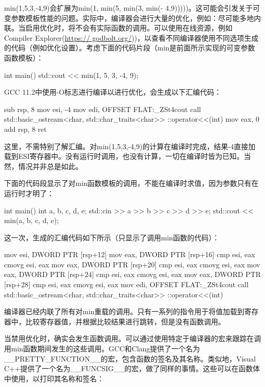 min(1,5,3,-4,9)会扩展为min(1, min(5, min(3, min(- 4,9)))))。这可能会引发关于可变参数模板性能的问题。实际中，编译器会进行大量的优化，例如：尽可能多地内联。当启用优化时，将不会有实际函数的调用。可以使用在线资源，例如Compiler Explorer(\url{https:// godbolt.org/}))，以查看不同编译器使用不同选项生成的代码（例如优化设置）。考虑下面的代码片段（min是前面所示实现的可变参数函数模板）：

\begin{cppcode}
int main()
{
	std::cout << min(1, 5, 3, -4, 9);
}
\end{cppcode}

GCC 11.2中使用-O标志进行编译以进行优化，会生成以下汇编代码：

\begin{cppcode}
sub rsp, 8
mov esi, -4
mov edi, OFFSET FLAT:_ZSt4cout
call std::basic_ostream<char, std::char_traits<char>>
        ::operator<<(int)
mov eax, 0
add rsp, 8
ret
\end{cppcode}

这里，不需特别了解汇编。对min(1,5,3,-4,9)的计算在编译时完成，结果-4直接加载到ESI寄存器中。没有运行时调用，也没有计算，一切在编译时皆为已知。当然，情况并非总是如此。

下面的代码段显示了对min函数模板的调用，不能在编译时求值，因为参数只有在运行时才明了：

\begin{cppcode}
int main()
{
	int a, b, c, d, e;
	std::cin >> a >> b >> c >> d >> e;
	std::cout << min(a, b, c, d, e);
}
\end{cppcode}

这一次，生成的汇编代码如下所示（只显示了调用min函数的代码）：

\begin{cppcode}
mov esi, DWORD PTR [rsp+12]
mov eax, DWORD PTR [rsp+16]
cmp esi, eax
cmovg esi, eax
mov eax, DWORD PTR [rsp+20]
cmp esi, eax
cmovg esi, eax
mov eax, DWORD PTR [rsp+24]
cmp esi, eax
cmovg esi, eax
mov eax, DWORD PTR [rsp+28]
cmp esi, eax
cmovg esi, eax
mov edi, OFFSET FLAT:_ZSt4cout
call std::basic_ostream<char, std::char_traits<char>>
        ::operator<<(int)
\end{cppcode}

编译器已经内联了所有对min重载的调用。只有一系列的指令用于将值加载到寄存器中，比较寄存器值，并根据比较结果进行跳转，但是没有函数调用。

当禁用优化时，确实会发生函数调用。可以通过使用特定于编译器的宏来跟踪在调用min函数期间发生的这些调用。GCC和Clang提供了一个名为__PRETTY_FUNCTION__的宏，包含函数的签名及其名称。类似地，Visual C++提供了一个名为__FUNCSIG__的宏，做了同样的事情。这些可以在函数体中使用，以打印其名称和签名：


